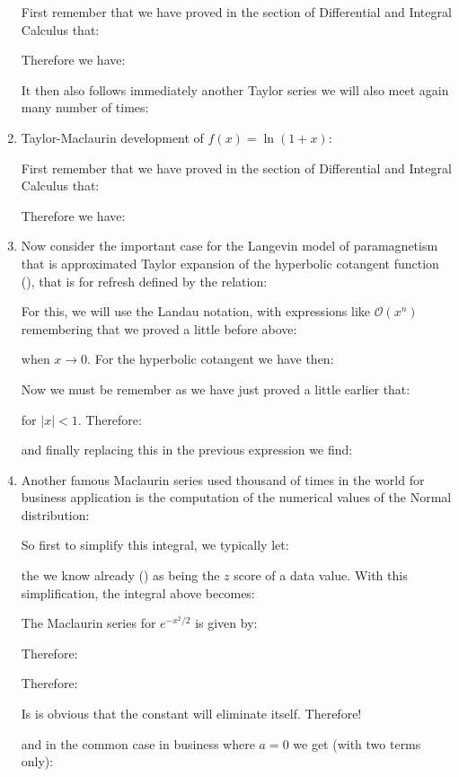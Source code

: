 \begin{enumerate}
		First remember that we have proved in the section of Differential and Integral Calculus that:
		
		Therefore we have:
		
		It then also follows immediately another Taylor series we will also meet again many  number of times:
		
		
		\item  Taylor-Maclaurin development of $f(x)=\ln(1+x)$:
		
		First remember that we have proved in the section of Differential and Integral Calculus that:
		
		Therefore we have:
		
		
		\item  Now consider the important case for the Langevin model of paramagnetism that is approximated Taylor expansion of the hyperbolic cotangent function (), that is for refresh defined by the relation:
		
		For this, we will use the Landau notation, with expressions like $\mathcal{O}(x^n)$ remembering that we proved a little before above:
		
		when $x \rightarrow 0$.
		For the hyperbolic cotangent we have then:
		
		Now we must be remember as we have just proved a little earlier that:
		
		for $\vert x \vert < 1$. Therefore:
		
		and finally replacing this in the previous expression we find:
		
		
		\item  Another famous Maclaurin series used thousand of times in the world for business application is the computation of the numerical values of the Normal distribution:
		
		So first to simplify this integral, we typically let:
		
		the we know already () as being the $z$ score of a data value. With this simplification, the integral above becomes:
		
		The Maclaurin series for $e^{-x^2/2}$ is given by:
		
		Therefore:
		
		Therefore:
		
		Is is obvious that the constant will eliminate itself. Therefore!
		
		and in the common case in business where $a=0$ we get (with two terms only):
		
	\end{enumerate}
	
